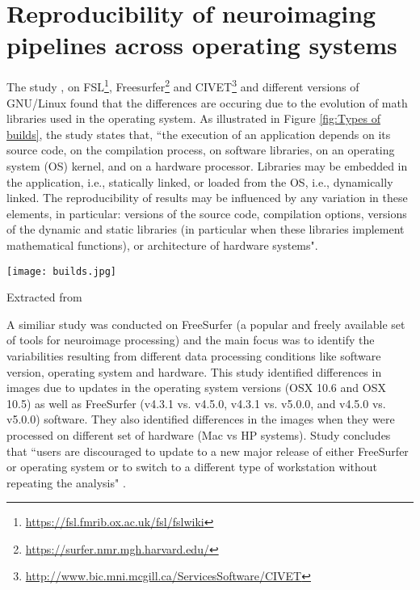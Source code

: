 \section{Reproducibility of neuroimaging pipelines across operating systems}

The study \cite{Gla15}, on FSL\footnote{\url{https://fsl.fmrib.ox.ac.uk/fsl/fslwiki}}, Freesurfer\footnote{\url{https://surfer.nmr.mgh.harvard.edu/}} and CIVET\footnote{\url{http://www.bic.mni.mcgill.ca/ServicesSoftware/CIVET}} and different versions of GNU/Linux found that the differences are occuring due to the evolution of math libraries used in the operating system. As illustrated in Figure \ref{fig:Types of builds}, the study \cite{Gla15} states that, ``the execution of an application depends on its source code, on the compilation process, on software libraries, on an operating system (OS) kernel, and on a hardware processor. Libraries may be embedded in the application, i.e., statically linked, or loaded from the OS, i.e., dynamically linked. The reproducibility of results may be influenced by any variation in these elements, in particular: versions of the source code, compilation options, versions of the dynamic and static libraries (in particular when these libraries implement mathematical functions), or architecture of hardware systems".

\begin{center}
\texttt{[image: builds.jpg]}
\label{fig:Types of builds}
\caption*{Extracted from \cite{Gla15}}
\end{center}

A similiar study \cite{10.1371/journal.pone.0038234} was conducted on FreeSurfer (a popular and freely available set of tools for neuroimage processing) and the main focus was to identify the variabilities resulting from different data processing conditions like software version, operating system and hardware. This study identified differences in images due to updates in the operating system versions (OSX 10.6 and OSX 10.5) as well as FreeSurfer (v4.3.1 vs. v4.5.0, v4.3.1 vs. v5.0.0, and v4.5.0 vs. v5.0.0) software. They also identified differences in the images when they were processed on different set of hardware (Mac vs HP systems). Study concludes that ``users are discouraged to update to a new major release of either FreeSurfer or operating system or to switch to a different type of workstation without repeating the analysis" \cite{10.1371/journal.pone.0038234}.

